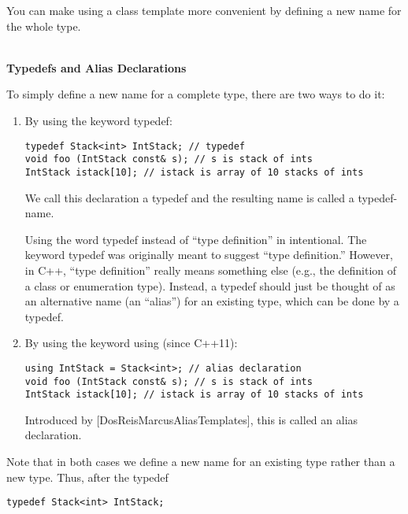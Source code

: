 
You can make using a class template more convenient by defining a new name for the whole type.

\hspace*{\fill} \\ %
\noindent
\textbf{Typedefs and Alias Declarations}

To simply define a new name for a complete type, there are two ways to do it:

\begin{enumerate}
\item
By using the keyword typedef:

\begin{lstlisting}[style=styleCXX]
typedef Stack<int> IntStack; // typedef
void foo (IntStack const& s); // s is stack of ints
IntStack istack[10]; // istack is array of 10 stacks of ints
\end{lstlisting}

We call this declaration a typedef and the resulting name is called a typedef-name.

\begin{tcolorbox}[colback=webgreen!5!white,colframe=webgreen!75!black]
\hspace*{0.75cm}Using the word typedef instead of “type definition” in intentional. The keyword typedef was originally meant to suggest “type definition.” However, in C++, “type definition” really means something else (e.g., the definition of a class or enumeration type). Instead, a typedef should just be thought of as an alternative name (an “alias”) for an existing type, which can be done by a typedef.
\end{tcolorbox}

\item
By using the keyword using (since C++11):

\begin{lstlisting}[style=styleCXX]
using IntStack = Stack<int>; // alias declaration
void foo (IntStack const& s); // s is stack of ints
IntStack istack[10]; // istack is array of 10 stacks of ints
\end{lstlisting}

Introduced by [DosReisMarcusAliasTemplates], this is called an alias declaration. 

\end{enumerate}

Note that in both cases we define a new name for an existing type rather than a new type. Thus, after the typedef

\begin{lstlisting}[style=styleCXX]
typedef Stack<int> IntStack;
\end{lstlisting}

